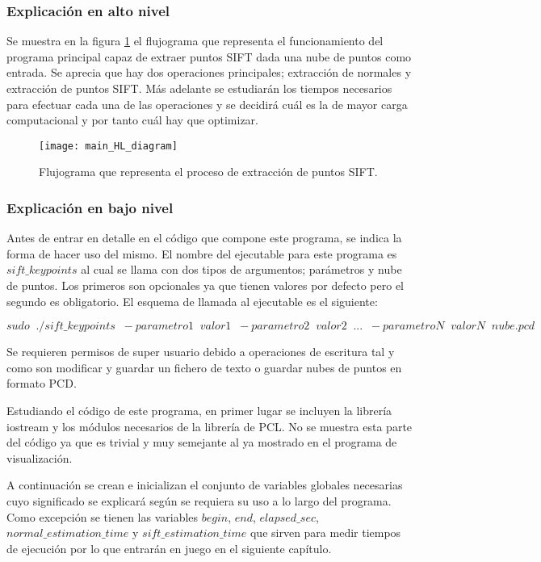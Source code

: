 \subsubsection{Explicación en alto nivel}
Se muestra en la figura \ref{fig:main_HL_diagram} el flujograma que representa el funcionamiento del programa principal capaz de extraer puntos SIFT dada una nube de puntos como entrada. Se aprecia que hay dos operaciones principales; extracción de normales y extracción de puntos SIFT. Más adelante se estudiarán los tiempos necesarios para efectuar cada una de las operaciones y se decidirá cuál es la de mayor carga computacional y por tanto cuál hay que optimizar.

\begin{figure}
\centering
\texttt{[image: main\_HL\_diagram]}
\caption{Flujograma que representa el proceso de extracción de puntos SIFT.}\label{fig:main_HL_diagram}
\end{figure}

\subsubsection{Explicación en bajo nivel}
Antes de entrar en detalle en el código que compone este programa, se indica la forma de hacer uso del mismo. 
El nombre del ejecutable para este programa es $sift\_keypoints$ al cual se llama con dos tipos de argumentos; parámetros y nube de puntos. Los primeros son opcionales ya que tienen valores por defecto pero el segundo es obligatorio. El esquema de llamada al ejecutable es el siguiente:

$$sudo \;\; ./sift\_keypoints \;\; -parametro1 \;\; valor1 \;\; -parametro2 \;\; valor2 \;\; ... \;\; -parametroN \;\; valorN \;\; nube.pcd$$

Se requieren permisos de super usuario debido a operaciones de escritura tal y como son modificar y guardar un fichero de texto o guardar nubes de puntos en formato PCD.


Estudiando el código de este programa, en primer lugar se incluyen la librería iostream y los módulos necesarios de la librería de PCL. No se muestra esta parte del código ya que es trivial y muy semejante al ya mostrado en el programa de visualización.

A continuación se crean e inicializan el conjunto de variables globales necesarias cuyo significado se explicará según se requiera su uso a lo largo del programa. Como excepción se tienen las variables $begin$, $end$, $elapsed\_sec$, $normal\_estimation\_time$ y $sift\_estimation\_time$ que sirven para medir tiempos de ejecución por lo que entrarán en juego en el siguiente capítulo.

